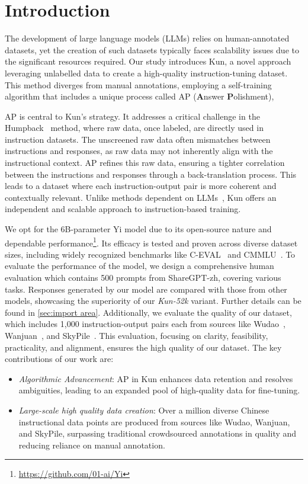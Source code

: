 \section{Introduction}

The development of large language models (LLMs) relies on human-annotated datasets, yet the creation of such datasets typically faces scalability issues due to the significant resources required. 
Our study introduces Kun, a novel approach leveraging unlabelled data to create a high-quality instruction-tuning dataset. 
This method diverges from manual annotations, employing a self-training algorithm that includes a unique process called AP (\textbf{A}nswer \textbf{P}olishment),

AP is central to Kun's strategy. 
It addresses a critical challenge in the Humpback~\citep{li2023self} method, where raw data, once labeled, are directly used in instruction datasets.
The unscreened raw data often mismatches between instructions and responses, as raw data may not inherently align with the instructional context. 
AP refines this raw data, ensuring a tighter correlation between the instructions and responses through a back-translation process. This leads to a dataset where each instruction-output pair is more coherent and contextually relevant.
Unlike methods dependent on LLMs~\citep{peng2023instruction,taori2023alpaca,zheng2023judging}, Kun offers an independent and scalable approach to instruction-based training.

We opt for the 6B-parameter Yi model due to its open-source nature and dependable performance\footnote{\url{https://github.com/01-ai/Yi}}. 
Its efficacy is tested and proven across diverse dataset sizes, including widely recognized benchmarks like C-EVAL~\citep{huang2023ceval} and CMMLU~\citep{li2023cmmlu}.
To evaluate the performance of the model, we design a comprehensive human evaluation which contains 500 prompts from ShareGPT-zh, covering various tasks. Responses generated by our model are compared with those from other models, showcasing the superiority of our \emph{Kun-52k} variant.
Further details can be found in \ref{sec:import area}.
Additionally, we evaluate the quality of our dataset, which includes 1,000 instruction-output pairs each from sources like Wudao~\citep{Wudao}, Wanjuan~\citep{he2023wanjuan}, and SkyPile~\citep{wei2023skywork}. This evaluation, focusing on clarity, feasibility, practicality, and alignment, ensures the high quality of our dataset.
The key contributions of our work are:

\begin{itemize}
\item \textit{Algorithmic Advancement}: AP in Kun enhances data retention and resolves ambiguities, leading to an expanded pool of high-quality data for fine-tuning.

\item \textit{Large-scale high quality data creation}: Over a million diverse Chinese instructional data points are produced from sources like Wudao, Wanjuan, and SkyPile, surpassing traditional crowdsourced annotations in quality and reducing reliance on manual annotation.
\end{itemize}

